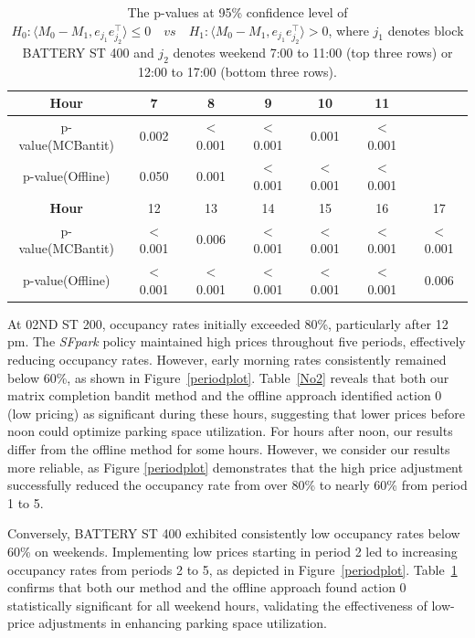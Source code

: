 \documentclass[12pt]{article}
\newcommand{\inp}[2]{\langle #1,#2\rangle}
\theoremstyle{plain}
\begin{document}
\begin{table}  [h]
    \caption{\label{No3} The p-values at 95\% confidence level of $H_0:\inp{M_0-M_1}{e_{j_1}e_{j_2}^{\top}}\leq 0 \quad vs \quad H_1:\inp{M_0-M_1}{e_{j_1}e_{j_2}^{\top}}> 0$, where $j_1$ denotes block BATTERY ST 400 and $j_2$ denotes weekend 7:00 to 11:00 (top three rows) or 12:00 to 17:00 (bottom three rows).}
    \centering
     \begin{tabular}{ccccccc}  
        \toprule 
        \textbf{Hour} & 7 & 8 & 9 & 10 & 11 \\  
        \midrule 
        p-value(MCBantit) & 0.002 & $<$0.001 & $<$0.001 & 0.001 & $<$0.001 \\
        p-value(Offline) & 0.050 & 0.001 & $<$0.001 & $<$0.001 & $<$0.001 \\
        \hline\hline
        \textbf{Hour} & 12 & 13 & 14 & 15 & 16 & 17 \\  
        \midrule 
        p-value(MCBantit) & $<$0.001 & 0.006 & $<$0.001 & $<$0.001 & $<$0.001 & $<$0.001 \\
        p-value(Offline) & $<$0.001 & $<$0.001 & $<$0.001 & $<$0.001 & $<$0.001 & 0.006 \\
        \bottomrule
    \end{tabular}%
\end{table}


 
At 02ND ST 200, occupancy rates initially exceeded 80\%, particularly after 12 pm. The \emph{SFpark} policy maintained high prices throughout five periods, effectively reducing occupancy rates. However, early morning rates consistently remained below 60\%, as shown in Figure~\ref{periodplot}. Table~\ref{No2} reveals that both our matrix completion bandit method and the offline approach identified action 0 (low pricing) as significant during these hours, suggesting that lower prices before noon could optimize parking space utilization. For hours after noon, our results differ from the offline method for some hours. However,
we consider our results more reliable, as Figure \ref{periodplot} demonstrates that the high price adjustment
successfully reduced the occupancy rate from over 80\% to nearly 60\% from period 1 to 5.



Conversely, BATTERY ST 400 exhibited consistently low occupancy rates below 60\% on weekends. Implementing low prices starting in period 2 led to increasing occupancy rates from periods 2 to 5, as depicted in Figure~\ref{periodplot}. Table~\ref{No3} confirms that both our method and the offline approach found action 0 statistically significant for all weekend hours, validating the effectiveness of low-price adjustments in enhancing parking space utilization.
\end{document}
